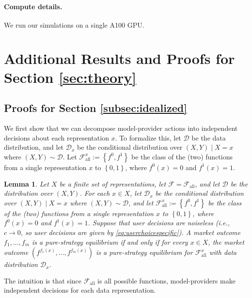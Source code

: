 \documentclass[letterpaper,11pt]{article}
\newtheorem{lemma}{Lemma}
\theoremstyle{plain}
\begin{document}
\paragraph{Compute details.} 
We run our simulations on a single A100 GPU.  


\section{Additional Results and Proofs for Section \ref{sec:theory}}\label{appendix:theory}

\subsection{Proofs for Section \ref{subsec:idealized}}
We first show that we can decompose model-provider actions into independent decisions about each representation $x$. To formalize this, let $\mathcal{D}$ be the data distribution, and let $\mathcal{D}_x$ be the conditional distribution over $(X,Y) \mid X = x$ where $(X,Y) \sim \mathcal{D}$. Let $\mathcal{F}_{\text{all}}^x := \left\{f^0, f^1\right\}$ be the class of the (two) functions from a single representation $x$ to $\left\{0,1\right\}$, where $f^0(x) = 0$ and $f^1(x) = 1$.  
\begin{lemma}
\label{lemma:decomposition}
Let $X$ be a finite set of representations, let $\mathcal{F} = \mathcal{F}_{\text{all}}$, and let $\mathcal{D}$ be the distribution over $(X,Y)$. For each $x \in X$, let $\mathcal{D}_x$ be the conditional distribution over $(X,Y) \mid X = x$ where $(X,Y) \sim \mathcal{D}$, and let $\mathcal{F}_{\text{all}}^x := \left\{f^0, f^1\right\}$ be the class of the (two) functions from a single representation $x$ to $\left\{0,1\right\}$, where $f^0(x) = 0$ and $f^1(x) = 1$. Suppose that user decisions are noiseless (i.e., $c \rightarrow 0$, so user decisions are given by \eqref{eq:userchoicespecific}). A market outcome $f_1, \ldots, f_m$ is a pure-strategy equilibrium if and only if for every $x \in X$, the market outcome $(f^{f_1(x)}, \ldots, f^{f_m(x)})$ is a pure-strategy equilibrium for $\mathcal{F}_{\text{all}}^x$ with data distribution $\mathcal{D}_x$.
\end{lemma}
The intuition is that since $\mathcal{F}_{\text{all}}$ is all possible functions, model-providers make independent decisions for each data representation. 
\end{document}

